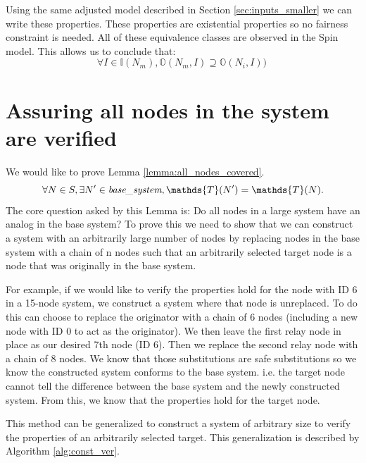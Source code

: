 \documentclass[runningheads]{llncs}
\newcommand{\basesystem}{\emph{base\_system}}
\newcommand{\inputset}[1]{\mathds{I}(#1)}
\newcommand{\outputset}[2]{\mathds{O}(#1, #2)}
\newcommand{\tracestruc}[1]{\mathds{T}(#1)}
\newif\ifcomments
\newcommand{\egm}[1]{\ifcomments\textcolor{orange}{egm: #1}\fi}
\newcommand{\krs}[1]{\ifcomments\textcolor{blue}{krs: #1}\fi}
\begin{document}
Using the same adjusted model described in Section \ref{sec:inputs_smaller} we can write these properties. These properties are existential properties so no fairness constraint is needed. All of these equivalence classes are observed in the Spin model. This allows us to conclude that:
$$\forall I \in \inputset{N_m}, \outputset{N_m}{I} \supseteq \outputset{N_i}{I})\ $$

\krs{TODO: I still need to add this to the mapping spin model.}

\section{Assuring all nodes in the system are verified}
\label{sec:nodes_map_base}
We would like to prove Lemma \ref{lemma:all_nodes_covered}. 
$$
\forall N \in S, \exists N' \in \basesystem, \tracestruc{N'} = \tracestruc{N}.
$$
The core question asked by this Lemma is:
Do all nodes in a large system have an analog in the base system?
To prove this we need to show that we can construct a system with an arbitrarily large number of nodes by replacing nodes in the base system with a chain of n nodes such that an arbitrarily selected target node is a node that was originally in the base system.

\egm{Move this into it's own section. Admit the lemma here, as needed for the proof, and in that later section, make the best argument possible and state that future work is to strengthen. The following paragraph and algorithm would go to that section.}
\krs{Moved from Section 3 here}

For example, if we would like to verify the properties hold for the node with ID 6 in a 15-node system, we construct a system where that node is unreplaced. To do this can choose to replace the originator with a chain of 6 nodes (including a new node with ID 0 to act as the originator). We then leave the first relay node in place as our desired 7th node (ID 6). Then we replace the second relay node with a chain of 8 nodes. We know that those substitutions are safe substitutions so we know the constructed system conforms to the base system. i.e. the target node cannot tell the difference between the base system and the newly constructed system. From this, we know that the properties hold for the target node. 

This method can be generalized to construct a system of arbitrary size to verify the properties of an arbitrarily selected target. This generalization is described by Algorithm \ref{alg:const_ver}.
\end{document}
